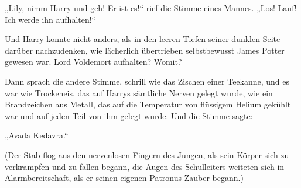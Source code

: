 \begin{em}
„Lily, nimm Harry und geh! Er ist es!“ rief die Stimme eines Mannes. „Los! Lauf! Ich werde ihn aufhalten!“

Und Harry konnte nicht anders, als in den leeren Tiefen seiner dunklen Seite darüber nachzudenken, wie lächerlich übertrieben selbstbewusst James Potter gewesen war. Lord Voldemort aufhalten? Womit?

Dann sprach die andere Stimme, schrill wie das Zischen einer Teekanne, und es war wie Trockeneis, das auf Harrys sämtliche Nerven gelegt wurde, wie ein Brandzeichen aus Metall, das auf die Temperatur von flüssigem Helium gekühlt war und auf jeden Teil von ihm gelegt wurde. Und die Stimme sagte:

„Avada Kedavra.“
\end{em}

(Der Stab flog aus den nervenlosen Fingern des Jungen, als sein Körper sich zu verkrampfen und zu fallen begann, die Augen des Schulleiters weiteten sich in Alarmbereitschaft, als er seinen eigenen Patronus-Zauber begann.)

